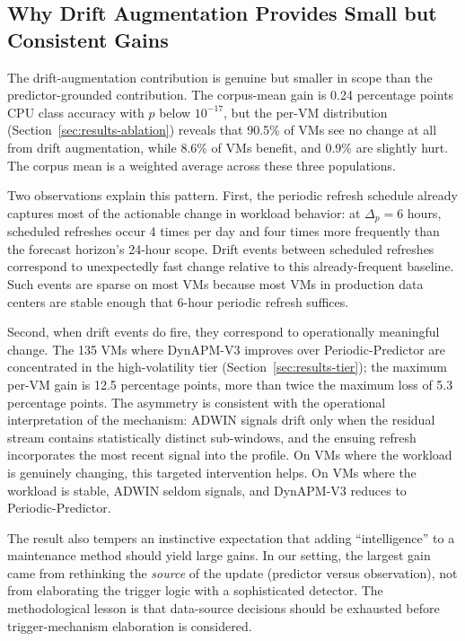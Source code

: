 \documentclass[manuscript,screen,review,anonymous]{acmart}
\begin{document}
\subsection{Why Drift Augmentation Provides Small but Consistent Gains}\label{sec:discussion-drift}

The drift-augmentation contribution is genuine but smaller in
scope than the predictor-grounded contribution. The corpus-mean
gain is 0.24 percentage points CPU class accuracy with $p$ below
$10^{-17}$, but the per-VM distribution
(Section~\ref{sec:results-ablation}) reveals that 90.5\% of VMs
see no change at all from drift augmentation, while 8.6\% of VMs
benefit, and 0.9\% are slightly hurt. The corpus mean is a
weighted average across these three populations.

Two observations explain this pattern. First, the periodic
refresh schedule already captures most of the actionable change
in workload behavior: at $\Delta_p = 6$ hours, scheduled refreshes
occur 4 times per day and four times more frequently than the
forecast horizon's 24-hour scope. Drift events between scheduled
refreshes correspond to unexpectedly fast change relative to this
already-frequent baseline. Such events are sparse on most VMs
because most VMs in production data centers are stable enough
that 6-hour periodic refresh suffices.

Second, when drift events do fire, they correspond to
operationally meaningful change. The 135 VMs where DynAPM-V3
improves over Periodic-Predictor are concentrated in the
high-volatility tier (Section~\ref{sec:results-tier}); the
maximum per-VM gain is 12.5 percentage points, more than twice
the maximum loss of 5.3 percentage points. The asymmetry is
consistent with the operational interpretation of the mechanism:
ADWIN signals drift only when the residual stream contains
statistically distinct sub-windows, and the ensuing refresh
incorporates the most recent signal into the profile. On VMs
where the workload is genuinely changing, this targeted
intervention helps. On VMs where the workload is stable, ADWIN
seldom signals, and DynAPM-V3 reduces to Periodic-Predictor.

The result also tempers an instinctive expectation that adding
``intelligence'' to a maintenance method should yield large
gains. In our setting, the largest gain came from rethinking the
\emph{source} of the update (predictor versus observation),
not from elaborating the trigger logic with a sophisticated
detector. The methodological lesson is that data-source decisions
should be exhausted before trigger-mechanism elaboration is
considered.
\end{document}
